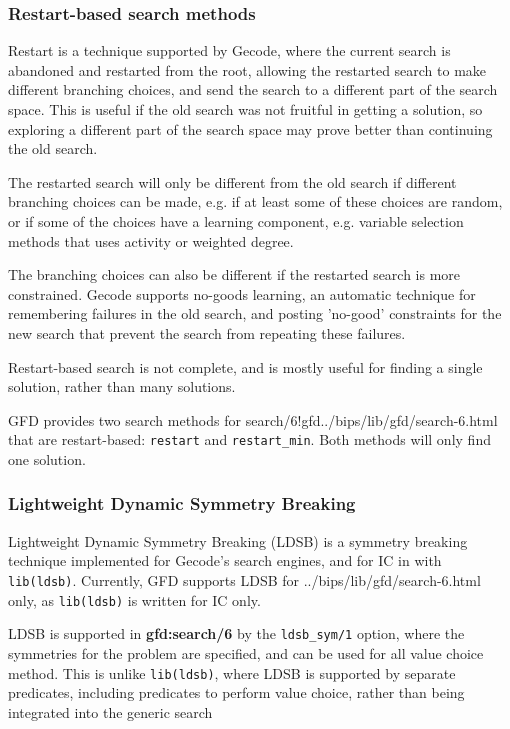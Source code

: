 \subsubsection{Restart-based search methods\label{restartsearch}}

Restart is a technique supported by Gecode,
where the current search is abandoned and restarted from the root,
allowing the restarted search to make different branching choices,
and send the search to a different part of the search space.
This is useful if the old search was not fruitful in getting
a solution, so exploring a different part of the search space may prove
better than continuing the old search.

The restarted search will only be different from the old search
if different branching choices can be made, e.g. if at least some of these
choices are random, or if some of the choices have a learning component,
e.g. variable selection methods that uses activity or weighted degree.

The branching choices can also be different if the restarted search
is more constrained. Gecode supports no-goods learning, an automatic 
technique for remembering failures in the old search, and posting 
'no-good' constraints for the new search that prevent the search from 
repeating these failures.

Restart-based search is not complete, and is mostly useful for finding a
single solution, rather than many solutions.

GFD provides two search methods for 
{search/6!gfd}{../bips/lib/gfd/search-6.html} that are restart-based:
\texttt{restart} and \texttt{restart_min}. Both methods
will only find one solution.
 
\subsubsection{Lightweight Dynamic Symmetry Breaking}
\label{ldsb}
Lightweight Dynamic Symmetry Breaking (LDSB) is a symmetry breaking 
technique implemented for Gecode's search engines, and for IC in \eclipse
with \texttt{lib(ldsb)}. Currently, GFD supports LDSB for 
{../bips/lib/gfd/search-6.html} only, as \texttt{lib(ldsb)} is written 
for IC only.

LDSB is supported in {\bf gfd:search/6} by the \texttt{ldsb_sym/1} option, 
where the  symmetries for the problem are specified, and can be used
for all value choice method. This is unlike 
\texttt{lib(ldsb)}, where LDSB is supported by separate predicates,
including predicates to perform value choice, rather than being integrated 
into the generic search

